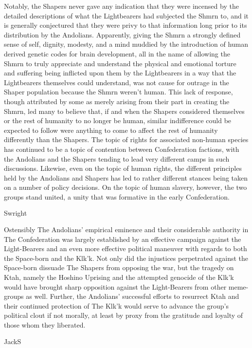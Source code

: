 Notably, the Shapers never gave any indication that they were incensed
by the detailed descriptions of what the Lightbearers had subjected
the Shmrn to, and it is generally conjectured that they were privy to
that information long prior to its distribution by the
Andolians. Apparently, giving the Shmrn a strongly defined sense of
self, dignity, modesty, and a mind muddied by the introduction of
human derived genetic codes for brain development, all in the name of
allowing the Shmrn to truly appreciate and understand the physical and
emotional torture and suffering being inflicted upon them by the
Lightbearers in a way that the Lightbearers themselves could
understand, was not cause for outrage in the Shaper population because
the Shmrn weren't human. This lack of response, though attributed by
some as merely arising from their part in creating the Shmrn, led many
to believe that, if and when the Shapers considered themselves or the
rest of humanity to no longer be human, similar indifference could be
expected to follow were anything to come to affect the rest of
humanity differently than the Shapers. The topic of rights for
associated non-human species has continued to be a topic of contention
between Confederation factions, with the Andolians and the Shapers
tending to lead very different camps in such discussions. Likewise,
even on the topic of human rights, the different principles held by
the Andolians and Shapers has led to rather different stances being
taken on a number of policy decisions. On the topic of human slavery,
however, the two groups stand united, a unity that was formative in
the early Confederation.


Swright

Ostensibly The Andolians' empirical eminence and their considerable
authority in The Confederation was largely established by an effective
campaign against the Light-Bearers and an even more effective
political maneuver with regards to both the Space-born and the
Klk'k. Not only did the injustices perpetrated against the Space-born
dissuade The Shapers from opposing the war, but the tragedy on Ktah,
namely the Hoshino Uprising and the attempted genocide of the Klk'k
would have brought sharp opposition against the Light-Bearers from
other meme-groups as well. Further, the Andolians' successful efforts
to resurrect Ktah and their continued protection of The Klk'k would
serve to advance the group's political clout if not morally, at least
by proxy from the gratitude and loyalty of those whom they liberated.

JackS
	
